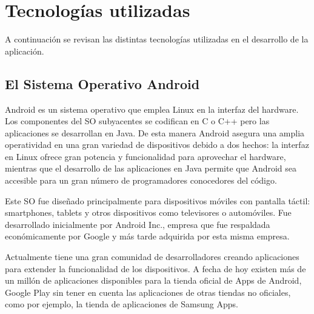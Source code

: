 \documentclass{article}
\begin{document}
\section{Tecnologías utilizadas}

A continuación se revisan las distintas tecnologías utilizadas en el desarrollo de la aplicación.

\subsection{El Sistema Operativo Android}

Android es un sistema operativo que emplea Linux en la interfaz del hardware.  Los componentes del SO subyacentes se codifican en C o C++ pero las aplicaciones se desarrollan en Java. De esta manera Android asegura una amplia operatividad en una gran variedad de dispositivos debido a dos hechos: la interfaz en Linux ofrece gran potencia y funcionalidad para aprovechar el hardware, mientras que el desarrollo de las aplicaciones en Java permite que Android sea accesible para un gran número de programadores conocedores del código.

Este SO fue diseñado principalmente para dispositivos móviles con pantalla táctil: smartphones, tablets y otros dispositivos como televisores o automóviles. Fue desarrollado inicialmente por Android Inc., empresa que fue respaldada económicamente por Google y más tarde adquirida por esta misma empresa.

Actualmente tiene una gran comunidad de desarrolladores creando aplicaciones para extender la funcionalidad de los dispositivos. A fecha de hoy existen más de un millón de aplicaciones disponibles para la tienda oficial de Apps de Android, Google Play sin tener en cuenta las aplicaciones de otras tiendas no oficiales, como por ejemplo, la tienda de aplicaciones de Samsung Apps.

    
\end{document}
